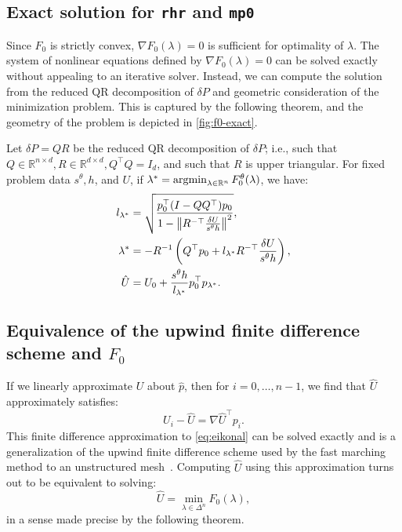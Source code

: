 \documentclass[sisc-eikonal.tex]{subfiles}
\begin{document}
\subsection{Exact solution for \texttt{rhr} and \texttt{mp0}}\label{ssec:exact-soln}

Since $F_0$ is strictly convex, $\nabla F_0(\lambda) = 0$ is
sufficient for optimality of $\lambda$. The system of nonlinear
equations defined by $\nabla F_0(\lambda) = 0$ can be solved exactly
without appealing to an iterative solver. Instead, we can compute the
solution from the reduced QR decomposition of $\delta P$ and geometric
consideration of the minimization problem. This is captured by the
following theorem, and the geometry of the problem is depicted in
\cref{fig:f0-exact}.

\begin{theorem}\label{thm:f0-exact}
  Let $\delta P = QR$ be the reduced QR decomposition of $\delta P$;
  i.e., such that
  $Q \in \mathbb{R}^{n \times d}, R \in \mathbb{R}^{d \times d},
  Q^\top Q = I_d$, and such that $R$ is upper triangular. For fixed
  problem data $s^\theta, h$, and $U$, if
  $\lambda^* = \operatorname{argmin}_{\lambda \in \mathbb{R}^n}
  F_0^\theta(\lambda)$, we have:
  \begin{align}
    l_{\lambda^*} &= \sqrt{\frac{p_0^\top {(I - QQ^\top)} p_0}{1 - \norm{R^{-\top} \frac{\delta U}{s^\theta h}}^2}},\label{eq:l-star-expression} \\
    \lambda^* &= -R^{-1} \parens{Q^\top p_0 + l_{\lambda^*} R^{-\top} \frac{\delta U}{s^\theta h}},\label{eq:f0-exact-lambda} \\ 
    \hat{U} &= U_0 + \frac{s^\theta h}{l_{\lambda^*}} p_0^\top p_{\lambda^*}.\label{eq:f0-exact}
  \end{align}
\end{theorem}

\subsection{Equivalence of the upwind finite difference scheme and
  $F_0$}\label{ssec:equivalence}

If we linearly approximate $U$ about $\hat{p}$, then for
$i = 0, \hdots, n - 1$, we find that $\hat{U}$ approximately
satisfies:
\begin{equation}
  \label{eq:finite-differences}
  U_i - \hat{U} = \nabla \hat{U}^\top p_i.
\end{equation}
This finite difference approximation to \cref{eq:eikonal} can be
solved exactly and is a generalization of the upwind finite difference
scheme used by the fast marching method to an unstructured
mesh~\cite{sethian2000fast}. Computing $\hat{U}$ using this
approximation turns out to be equivalent to solving:
\begin{equation}
  \hat{U} = \min_{\lambda \in \Delta^n} F_0(\lambda),
\end{equation}
in a sense made precise by the following theorem.
\end{document}
